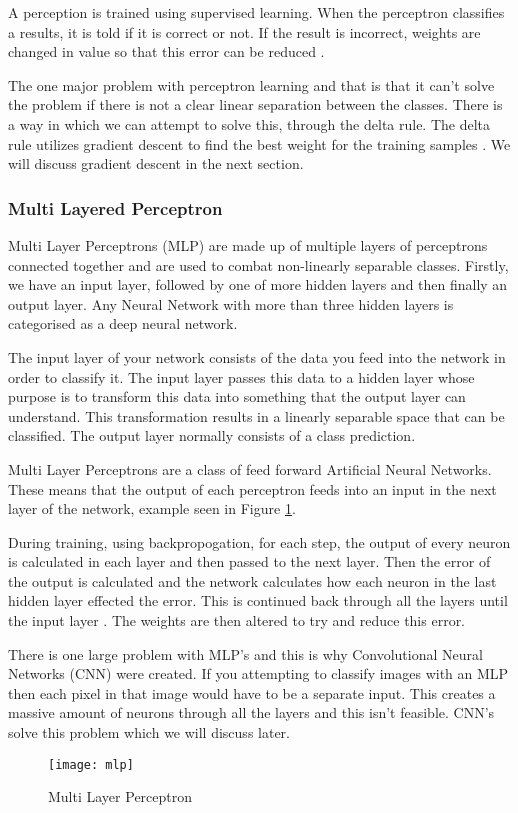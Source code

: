 A perception is trained using supervised learning. When the perceptron
classifies a results, it is told if it is correct or not. If the result is
incorrect, weights are changed in value so that this error can be reduced
\textcite{AI}. 

The one major problem with perceptron learning and that is that it can't solve
the problem if there is not a clear linear separation between the classes. There
is a way in which we can attempt to solve this, through the delta rule. The
delta rule utilizes gradient descent to find the best weight for the training
samples \textcite{MLANN}. We will discuss gradient descent in the next section.

\subsubsection*{Multi Layered Perceptron}
Multi Layer Perceptrons (MLP) are made up of multiple layers of perceptrons connected
together and are used to combat non-linearly separable classes.
Firstly, we have an input layer, followed by one of more hidden layers and then
finally an output layer.
Any Neural Network with more than three hidden layers is categorised as a deep neural network.

The input layer of your network consists of the data you feed into the network
in order to classify it. The input layer passes this data to a hidden layer
whose purpose is to transform this data into something that the output layer can
understand. This transformation results in a linearly separable space that can be classified. The output layer normally consists of a class prediction.

Multi Layer Perceptrons are a class of feed forward Artificial Neural Networks.
These means that the output of each perceptron feeds into an input in the next
layer of the network, example seen in Figure \ref{fig:mlp}.

During training, using backpropogation, for each step, the output of every neuron is calculated in each layer and then passed to the next layer. Then the error of the output is calculated and the network calculates how each neuron in the last hidden layer effected the error. This is continued back through all the layers until the input layer \textcite{handsOnML}. The weights are then altered to try and reduce this error.

There is one large problem with MLP's and this is why Convolutional Neural
Networks (CNN) were created. If you attempting to classify images with an MLP then
each pixel in that image would have to be a separate input. This creates a
massive amount of neurons through all the layers and this isn't feasible. CNN's
solve this problem which we will discuss later.

\begin{figure}
    \texttt{[image: mlp]}
     \caption{Multi Layer Perceptron}
     \label{fig:mlp}
\end{figure}


